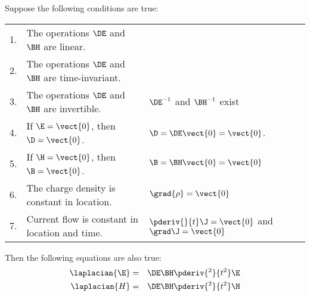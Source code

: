 \begin{theorem}
\label{thm_diffwave}
Suppose the following conditions are true:

\begin{tabular}{lll}
   1. & The operations $\DE$ and $\BH$ are linear.      \\
   2. & The operations $\DE$ and $\BH$ are time-invariant.   \\
   3. & The operations $\DE$ and $\BH$ are invertible.    & $\DE^{-1}$ and $\BH^{-1}$ exist \\
   4. & If $\E=\vect{0}$, then $\D=\vect{0}$.                    & $\D = \DE \vect{0}=\vect{0}$. \\
   5. & If $\H=\vect{0}$, then $\B=\vect{0}$.                    & $\B = \BH \vect{0}=\vect{0}$ \\
   6. & The charge density is constant in location.              & $\grad{\rho}=\vect{0}$ \\
   7. & Current flow is constant in location and time. & $\pderiv{}{t}\J = \vect{0}$ and $\grad\J=\vect{0}$
\end{tabular}

Then the following equations are also true:
\begin{eqnarray}
   \laplacian{\E} &=& \DE \BH \pderiv{^2}{t^2}\E  \\
   \laplacian{H} &=& \DE\BH  \pderiv{^2}{t^2}\H
\end{eqnarray}
\end{theorem}

